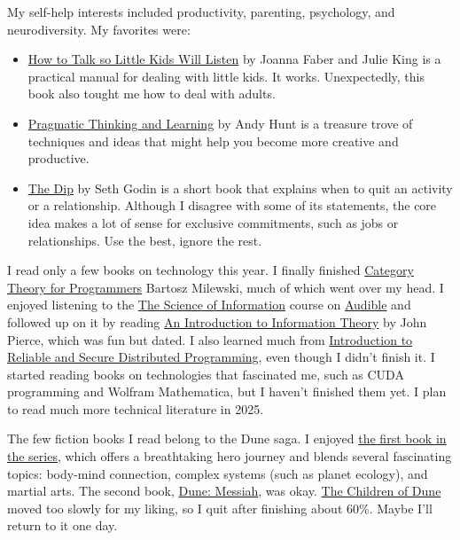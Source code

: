 \documentclass{article}
\begin{document}
My self-help interests included productivity, parenting, psychology, and neurodiversity.
My favorites were:
\begin{itemize}
\item
\href{https://www.goodreads.com/book/show/29430725-how-to-talk-so-little-kids-will-listen}{How to Talk so Little Kids Will Listen} by Joanna Faber and Julie King is a practical manual for dealing with little kids.
It works.
Unexpectedly, this book also tought me how to deal with adults.
\item
\href{https://www.goodreads.com/book/show/3063393-pragmatic-thinking-and-learning}{Pragmatic Thinking and Learning} by Andy Hunt is a treasure trove of techniques and ideas that might help you become more creative and productive.
\item
\href{https://www.goodreads.com/book/show/324748.The_Dip}{The Dip} by Seth Godin is a short book that explains when to quit an activity or a relationship.
Although I disagree with some of its statements, the core idea makes a lot of sense for exclusive commitments, such as jobs or relationships.
Use the best, ignore the rest.
\end{itemize}

I read only a few books on technology this year.
I finally finished \href{https://www.goodreads.com/book/show/33618151-category-theory-for-programmers}{Category Theory for Programmers} Bartosz Milewski, much of which went over my head.
I enjoyed listening to the \href{https://www.thegreatcourses.com/courses/the-science-of-information-from-language-to-black-holes}{The Science of Information} course on \href{https://www.audible.de/pd/The-Science-of-Information-From-Language-to-Black-Holes-Hoerbuch/1629976067}{Audible}
and followed up on it by reading \href{https://www.goodreads.com/book/show/433443.An_Introduction_to_Information_Theory}{An Introduction to Information Theory} by John Pierce, which was fun but dated.
I also learned much from \href{https://www.goodreads.com/book/show/10064443-introduction-to-reliable-and-secure-distributed-programming}{Introduction to Reliable and Secure Distributed Programming}, even though I didn't finish it.
I started reading books on technologies that fascinated me, such as CUDA programming and Wolfram Mathematica, but I haven't finished them yet.
I plan to read much more technical literature in 2025.

The few fiction books I read belong to the Dune saga.
I enjoyed \href{https://www.goodreads.com/book/show/44767458-dune}{the first book in the series}, which offers a breathtaking hero journey and blends several fascinating topics:
body-mind connection, complex systems (such as planet ecology), and martial arts.
The second book, \href{https://www.goodreads.com/book/show/44492285-dune-messiah}{Dune: Messiah}, was okay.
\href{https://www.goodreads.com/book/show/46037428-children-of-dune}{The Children of Dune} moved too slowly for my liking, so I quit after finishing about 60\%.
Maybe I'll return to it one day.
\end{document}
